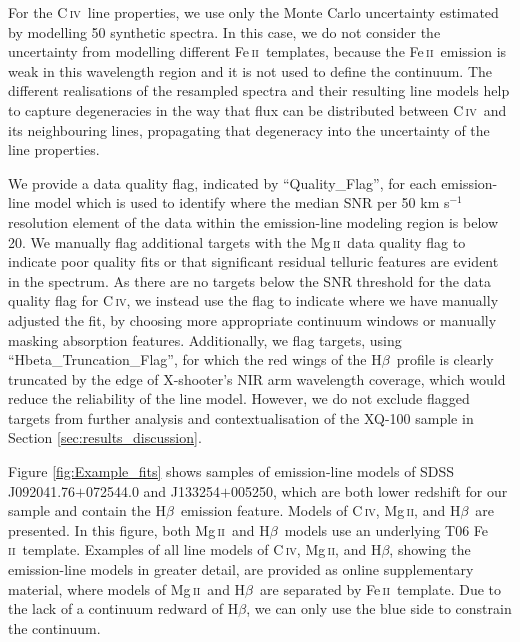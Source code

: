 \documentclass[fleqn,usenatbib]{mnras}
\newcommand{\mgii}{Mg\,\textsc{ii}}
\newcommand{\civ}{C\,\textsc{iv}}
\newcommand{\feii}{Fe\,\textsc{ii}}
\newcommand{\hbeta}{H\textsc{$\beta$}}
\begin{document}
For the \civ\ line properties, we use only the Monte Carlo uncertainty estimated by modelling 50 synthetic spectra. In this case, we do not consider the uncertainty from modelling different \feii\ templates, because the \feii\ emission is weak in this wavelength region and it is not used to define the continuum. The different realisations of the resampled spectra and their resulting line models help to capture degeneracies in the way that flux can be distributed between \civ\ and its neighbouring lines, propagating that degeneracy into the uncertainty of the line properties.

We provide a data quality flag, indicated by ``Quality\_Flag'', for each emission-line model which is used to identify where the median SNR per 50 km s$^{-1}$ resolution element of the data within the emission-line modeling region is below 20. We manually flag additional targets with the \mgii\ data quality flag to indicate poor quality fits or that significant residual telluric features are evident in the spectrum. As there are no targets below the SNR threshold for the data quality flag for \civ, we instead use the flag to indicate where we have manually adjusted the fit, by choosing more appropriate continuum windows or manually masking absorption features. Additionally, we flag targets, using ``Hbeta\_Truncation\_Flag'', for which the red wings of the \hbeta\ profile is clearly truncated by the edge of X-shooter's NIR arm wavelength coverage, which would reduce the reliability of the line model. However, we do not exclude flagged targets from further analysis and contextualisation of the XQ-100 sample in Section \ref{sec:results_discussion}. 

Figure \ref{fig:Example_fits} shows samples of emission-line models of SDSS J092041.76$+$072544.0 and J133254$+$005250, which are both lower redshift for our sample and contain the \hbeta\ emission feature. Models of \civ, \mgii, and \hbeta\ are presented. In this figure, both \mgii\ and \hbeta\ models use an underlying T06 \feii\ template. Examples of all line models of \civ, \mgii, and \hbeta, showing the emission-line models in greater detail, are provided as online supplementary material, where models of \mgii\ and \hbeta\ are separated by \feii\ template. Due to the lack of a continuum redward of \hbeta, we can only use the blue side to constrain the continuum.
\end{document}
